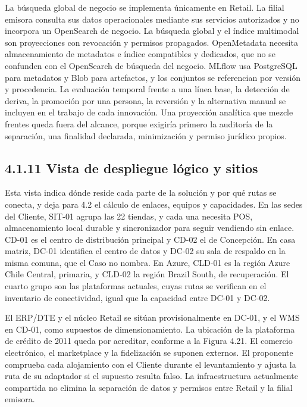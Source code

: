 \documentclass[11pt]{article}
\begin{document}
La búsqueda global de negocio se implementa únicamente en Retail. La filial emisora consulta sus datos operacionales mediante sus servicios autorizados y no incorpora un OpenSearch de negocio. La búsqueda global y el índice multimodal son proyecciones con revocación y permisos propagados. OpenMetadata necesita almacenamiento de metadatos e índice compatibles y dedicados, que no se confunden con el OpenSearch de búsqueda del negocio. MLflow usa PostgreSQL para metadatos y Blob para artefactos, y los conjuntos se referencian por versión y procedencia. La evaluación temporal frente a una línea base, la detección de deriva, la promoción por una persona, la reversión y la alternativa manual se incluyen en el trabajo de cada innovación. Una proyección analítica que mezcle frentes queda fuera del alcance, porque exigiría primero la auditoría de la separación, una finalidad declarada, minimización y permiso jurídico propios.

\subsection{4.1.11 Vista de despliegue lógico y sitios}

Esta vista indica dónde reside cada parte de la solución y por qué rutas se conecta, y deja para 4.2 el cálculo de enlaces, equipos y capacidades. En las sedes del Cliente, SIT-01 agrupa las 22 tiendas, y cada una necesita POS, almacenamiento local durable y sincronizador para seguir vendiendo sin enlace. CD-01 es el centro de distribución principal y CD-02 el de Concepción. En casa matriz, DC-01 identifica el centro de datos y DC-02 su sala de respaldo en la misma comuna, que el Caso no nombra. En Azure, CLD-01 es la región Azure Chile Central, primaria, y CLD-02 la región Brazil South, de recuperación. El cuarto grupo son las plataformas actuales, cuyas rutas se verifican en el inventario de conectividad, igual que la capacidad entre DC-01 y DC-02.

El ERP/DTE y el núcleo Retail se sitúan provisionalmente en DC-01, y el WMS en CD-01, como supuestos de dimensionamiento. La ubicación de la plataforma de crédito de 2011 queda por acreditar, conforme a la Figura 4.21. El comercio electrónico, el marketplace y la fidelización se suponen externos. El proponente comprueba cada alojamiento con el Cliente durante el levantamiento y ajusta la ruta de su adaptador si el supuesto resulta falso. La infraestructura actualmente compartida no elimina la separación de datos y permisos entre Retail y la filial emisora.
\end{document}
